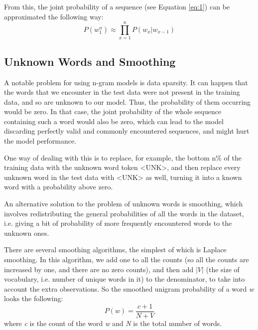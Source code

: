 \documentclass[sigplan,screen]{acmart}
\begin{document}
From this, the joint probability of a sequence (see Equation \ref{eq:1}) can be approximated the following way:
\begin{equation}
    P(w_1^n) \approx \prod_{x=1}^n P(w_x|w_{x-1})
\end{equation}

\subsection{Unknown Words and Smoothing}
A notable problem for using n-gram models is data sparsity. It can happen that the words that we encounter in the test data were not present in the training data, and so are unknown to our model. Thus, the probability of them occurring would be zero. In that case, the joint probability of the whole sequence containing such a word would also be zero, which can lead to the model discarding perfectly valid and commonly encountered sequences, and might hurt the model performance.

One way of dealing with this is to replace, for example, the bottom n\% of the training data with the unknown word token <UNK>, and then replace every unknown word in the test data with <UNK> as well, turning it into a known word with a probability above zero.

An alternative solution to the problem of unknown words is smoothing, which involves redistributing the general probabilities of all the words in the dataset, i.e. giving a bit of probability of more frequently encountered words to the unknown ones.

There are several smoothing algorithms, the simplest of which is Laplace smoothing. In this algorithm, we add one to all the counts (so all the counts are increased by one, and there are no zero counts), and then add $|V|$ (the size of vocabulary, i.e. number of unique words in it) to the denominator, to take into account the extra observations. So the smoothed unigram probability of a word \textit{w} looks the following:
\begin{equation}
    P(w)=\frac{c+1}{N+V}
\end{equation}
where \textit{c} is the count of the word \textit{w} and \textit{N} is the total number of words.
\end{document}
